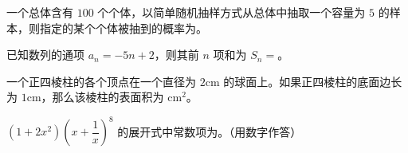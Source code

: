 \begin{question}
一个总体含有 $100$ 个个体，以简单随机抽样方式从总体中抽取一个容量为 $5$ 的样本，则指定的某个个体被抽到的概率为\gkblank{}。

\end{question}
\begin{question}
已知数列的通项 $a_n=-5n+2$，则其前 $n$ 项和为 $S_n=$\gkblank{}。

\end{question}
\begin{question}
一个正四棱柱的各个顶点在一个直径为 $2\mathrm{cm}$ 的球面上。如果正四棱柱的底面边长为 $1\mathrm{cm}$，那么该棱柱的表面积为\gkblank{} $\mathrm{cm}^2$。

\end{question}
\begin{question}
$(1+2x^2)\left(x+\dfrac1x\right)^8$ 的展开式中常数项为\gkblank{}。（用数字作答）

\end{question}

